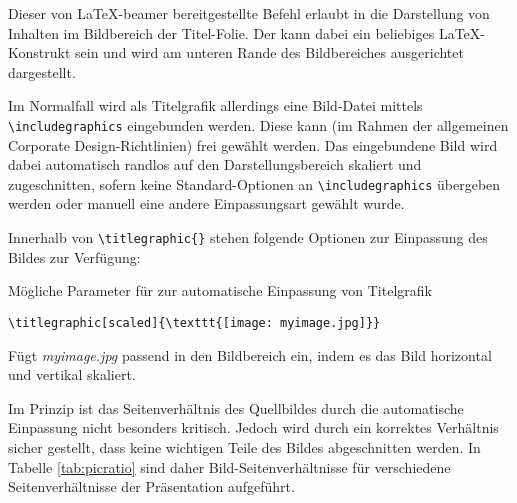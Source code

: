 \begin{sloppypar}
Dieser von \LaTeX-beamer bereitgestellte Befehl erlaubt in \tubslatex
die Darstellung von Inhalten im Bildbereich der Titel-Folie.
Der  kann dabei ein beliebiges \LaTeX-Konstrukt sein
und wird am unteren Rande des Bildbereiches ausgerichtet dargestellt.

Im Normalfall wird als Titelgrafik allerdings eine Bild-Datei mittels
\lstinline{\includegraphics} eingebunden werden.
Diese kann (im Rahmen der allgemeinen Corporate Design-Richtlinien)%
frei gewählt werden.
Das eingebundene Bild wird dabei automatisch randlos
auf den Darstellungsbereich skaliert und zugeschnitten, sofern keine
Standard-Optionen an \lstinline{\includegraphics} übergeben werden oder
manuell eine andere Einpassungsart gewählt wurde.

Innerhalb von \lstinline!\titlegraphic{}! stehen folgende
Optionen zur Einpassung des Bildes zur Verfügung:
\end{sloppypar}

\begin{desctable}
\toprule
{}
\bottomrule
\caption{Mögliche Parameter für  zur
automatische Einpassung von Titelgrafik}
\end{desctable}

\begin{Example}
  \begin{lstlisting}
\titlegraphic[scaled]{\texttt{[image: myimage.jpg]}}
  \end{lstlisting}
  Fügt \textit{myimage.jpg} passend in den Bildbereich ein, indem es das Bild
  horizontal und vertikal skaliert.
\end{Example}

Im Prinzip ist das Seitenverhältnis des Quellbildes durch die automatische
Einpassung nicht besonders kritisch. Jedoch wird durch ein korrektes Verhältnis
sicher gestellt, dass keine wichtigen Teile des Bildes abgeschnitten werden.
In Tabelle \ref{tab:picratio} sind daher Bild-Seiten\-verhältnisse für
verschiedene Seitenverhältnisse der Präsentation aufgeführt.

